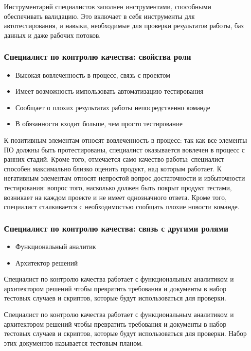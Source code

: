 \documentclass{../industrial-development}
\begin{document}
\lecturenotes

Инструментарий специалистов заполнен инструментами, способными обеспечивать валидацию. Это включает в себя инструменты для автотестирования, и навыки, необходимые для проверки результатов работы, баз данных и даже рабочих потоков.  ~\cite{Anatomy}

\begin{frame} \frametitle{Специалист по контролю качества: свойства роли}
  \begin{itemize}
  \item Высокая вовлеченность в процесс, связь с проектом
  \item Имеет возможность импользовать автоматизацию тестирования
  \item Сообщает о плохих результатах работы непосредственно команде
  \item В обязанности входит больше, чем просто тестирование
  \end{itemize}
\end{frame}

\lecturenotes

К позитивным элементам относят вовлеченность в процесс: так как все элементы ПО должны быть протестированы, специалист оказывается вовлечен в процесс с ранних стадий. Кроме того, отмечается само качество работы: специалист способен максимально близко оценить продукт, над которым работает. 
К негативным элементам относят непростой вопрос достаточности и избыточности тестирования: вопрос того, насколько должен быть покрыт продукт тестами, возникает на каждом проекте и не имеет однозначного ответа. Кроме того, специалист сталкивается с необходимостью сообщать плохие новости команде.  ~\cite{Anatomy}

\begin{frame} \frametitle{Специалист по контролю качества: связь с другими ролями}
  \begin{itemize}
  \item Функциональный аналитик
  \item Архитектор решений
  \end{itemize}
\begin{block}{}
	\alert {}Специалист по контролю качества работает с функциональным аналитиком и архитектором решений чтобы превратить требования и документы в набор тестовых случаев и скриптов, которые будут использоваться для проверки. 
\end{block}
\end{frame}
\lecturenotes
Специалист по контролю качества работает с функциональным аналитиком и архитектором решений чтобы превратить требования и документы в набор тестовых случаев и скриптов, которые будут использоваться для проверки. Набор этих документов называется тестовым планом.  ~\cite{Anatomy}
\end{document}
